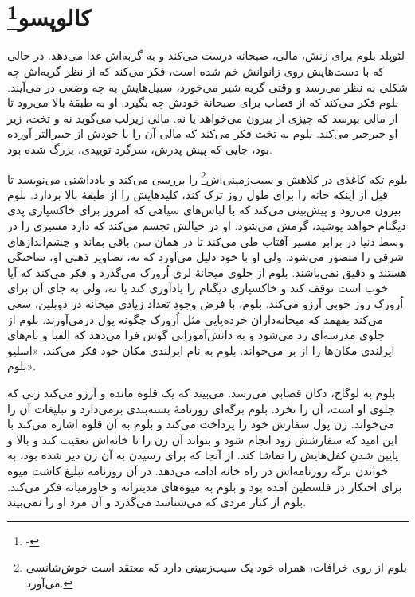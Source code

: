 \documentclass[12pt]{book}
\begin{document}
    \chapter[کالوپسو]{کالوپسو\protect\footnote{-}}\label{ep:4}
    لئوپلد بلوم برای زنش، مالی، صبحانه درست می‌کند و به گربه‌اش غذا می‌دهد. در حالی که با دست‌هایش روی زانوانش خم شده است، فکر می‌کند که از نظر گربه‌اش چه شکلی به نظر می‌رسد و وقتی گربه شیر می‌خورد، سبیل‌هایش به چه وضعی در می‌آیند. بلوم فکر می‌کند که از قصاب برای صبحانۀ خودش چه بگیرد. او به طبقۀ بالا می‌رود تا از مالی بپرسد که چیزی از بیرون می‌خواهد یا نه. مالی زیرلب می‌گوید نه و تخت، زیر او جیرجیر می‌کند. بلوم به تخت فکر می‌کند که مالی آن را با خودش از جیبرالتر آورده بود، جایی که پیش پدرش، سرگرد توییدی، بزرگ شده بود.

    بلوم تکه کاغذی در کلاهش و سیب‌زمینی‌اش\footnote{بلوم از روی خرافات، همراه خود یک سیب‌زمینی دارد که معتقد است خوش‌شانسی می‌آورد.} را بررسی می‌کند و یادداشتی می‌نویسد تا قبل از اینکه خانه را برای طول روز ترک کند، کلیدهایش را از طبقۀ بالا بردارد. بلوم بیرون می‌رود و پیش‌بینی می‌کند که با لباس‌های سیاهی که امروز برای خاکسپاری پدی دیگنام خواهد پوشید، گرمش می‌شود. او در خیالش تجسم می‌کند که دارد مسیری را در وسط دنیا در برابر مسیر آفتاب طی می‌کند تا در همان سن باقی بماند و چشم‌اندازهای شرقی را متصور می‌شود. ولی او با خود دلیل می‌آورد که نه، تصاویر ذهنی او، ساختگی هستند و دقیق نمی‌باشند. بلوم از جلوی میخانۀ لری اُرورک می‌گذرد و فکر می‌کند که آیا خوب است توقف کند و خاکسپاری دیگنام را یادآوری کند یا نه، ولی به جای آن برای اُرورک روز خوبی آرزو می‌کند. بلوم، با فرض وجودِ تعداد زیادی میخانه در دوبلین، سعی می‌کند بفهمد که میخانه‌داران خرده‌پایی مثل اُرورک چگونه پول درمی‌آورند. بلوم از جلوی مدرسه‌ای رد می‌شود و به دانش‌آموزانی گوش فرا می‌دهد که الفبا و نام‌های ایرلندی مکان‌ها را از بر می‌خواند. بلوم به نام ایرلندی مکان خود فکر می‌کند، «اسلیو بلوم».

    بلوم به لوگاچ، دکان قصابی می‌رسد. می‌بیند که یک قلوه مانده و آرزو می‌کند زنی که جلوی او است، آن را نخرد. بلوم برگه‌ای روزنامۀ بسته‌بندی برمی‌دارد و تبلیغات آن را می‌خواند. زن پول سفارش خود را پرداخت می‌کند و بلوم به آن قلوه اشاره می‌کند با این امید که سفارشش زود انجام شود و بتواند آن زن را تا خانه‌اش تعقیب کند و بالا و پایین شدنِ کفل‌هایش را تماشا کند. از آنجا که برای رسیدن به آن زن دیر شده بود، به خواندن برگه روزنامه‌اش در راه خانه ادامه می‌دهد. در آن روزنامه تبلیغ کاشت میوه برای احتکار در فلسطین آمده بود و بلوم به میوه‌های مدیترانه و خاورمیانه فکر می‌کند. بلوم از کنار مردی که می‌شناسد می‌گذرد و آن مرد او را نمی‌بیند.
\end{document}

